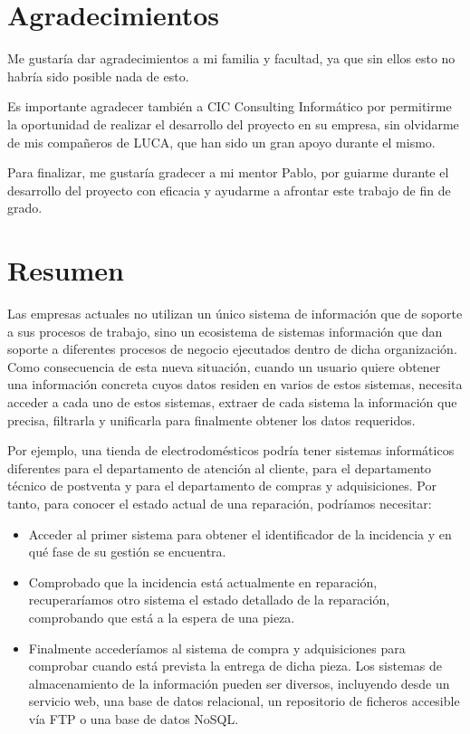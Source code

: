 \chapter*{Agradecimientos}
	Me gustaría dar agradecimientos a mi familia y facultad, ya que sin ellos esto no habría sido posible nada de esto.
	
	 Es importante agradecer también a CIC Consulting Informático por permitirme la oportunidad de realizar el desarrollo del proyecto en su empresa, sin olvidarme de mis compañeros de LUCA, que han sido un gran apoyo durante el mismo.
	
	 Para finalizar, me gustaría gradecer a mi mentor Pablo, por guiarme durante el desarrollo del proyecto con eficacia y ayudarme a afrontar este trabajo de fin de grado.

	
\chapter*{Resumen}
	Las empresas actuales no utilizan un único sistema de información que de soporte a sus procesos de trabajo, sino un  ecosistema de sistemas información que dan soporte a diferentes procesos de negocio ejecutados dentro de dicha organización. Como consecuencia de esta nueva situación, cuando un usuario	quiere obtener una información concreta cuyos datos residen en varios de estos
	sistemas, necesita acceder a cada uno de estos sistemas, extraer de cada sistema la información que precisa, filtrarla y unificarla para finalmente	obtener los datos requeridos.
	
	
	Por ejemplo, una tienda de electrodomésticos podría tener sistemas informáticos diferentes para el departamento de atención al cliente, para el departamento técnico de postventa y para el departamento de compras y adquisiciones. Por tanto, para conocer el estado actual de una reparación, podríamos necesitar:
		\begin{itemize}
			\item  Acceder al primer sistema para obtener el identificador de la incidencia y en qué fase de su gestión se encuentra.
			\item  Comprobado que la incidencia está actualmente en reparación, recuperaríamos otro sistema el estado detallado de la reparación, comprobando que está a la espera de una pieza.
			\item Finalmente accederíamos al sistema de compra y adquisiciones para comprobar cuando está prevista la entrega de dicha pieza. Los sistemas de almacenamiento de la información pueden ser diversos, incluyendo desde un servicio web, una base de datos relacional, un repositorio de ficheros accesible vía FTP o una base de datos NoSQL.
		\end{itemize}
	
